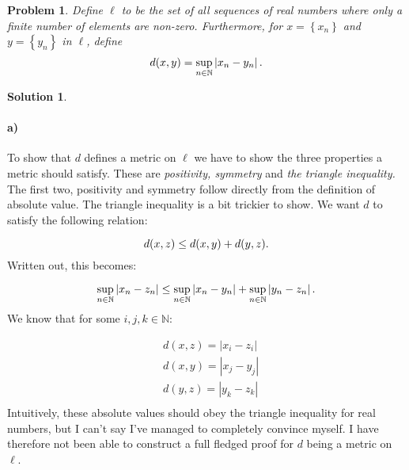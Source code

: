 \documentclass[a4paper]{article}
\newtheorem{prb}{Problem}
\theoremstyle{definition}
\newtheorem{sol}{Solution}
\begin{document}
\begin{prb}
  Define $\ell$ to be the set of all sequences of real numbers where only a
  finite number of elements are non-zero. Furthermore, for $x = \left\{ x_n \right\}$ and
  $y = \left\{ y_n \right\}$ in $\ell$, define
  \begin{equation}
    \notag
    d(x, y) = \sup\limits_{n\in\mathbb{N}} \left| x_n - y_n\right|.
  \end{equation}
\end{prb}

\begin{sol}
\item\paragraph{a)} %

To show that $d$ defines a metric on $\ell$ we have to show the three
properties a metric should satisfy. These are \textit{positivity, symmetry} and
\textit{the triangle inequality.} The first two, positivity and symmetry follow
directly from the definition of absolute value.  The triangle inequality is a
bit trickier to show. We want $d$ to satisfy the following relation:

\begin{equation}
  \notag
  d(x, z) \leq d(x, y) + d(y, z).
\end{equation}
Written out, this becomes:

\begin{equation}
  \notag
  \sup\limits_{n\in\mathbb{N}} \left| x_n - z_n\right| \leq \sup\limits_{n\in\mathbb{N}} \left| x_n - y_n\right| +  \sup\limits_{n\in\mathbb{N}} \left| y_n - z_n\right|.
\end{equation}
We know that for some $i, j, k \in \mathbb{N}$:

\begin{align*}
  \label{eq:}
  &d(x, z) = \left| x_i - z_i \right| \\
  &d(x, y) = \left| x_j - y_j \right| \\
  &d(y, z) = \left| y_k - z_k \right| \\
\end{align*}
Intuitively, these absolute values should obey the triangle inequality for real
numbers, but I can't say I've managed to completely convince myself. I have
therefore not been able to construct a full fledged proof for $d$ being a
metric on $\ell$.


\end{sol}
\end{document}
